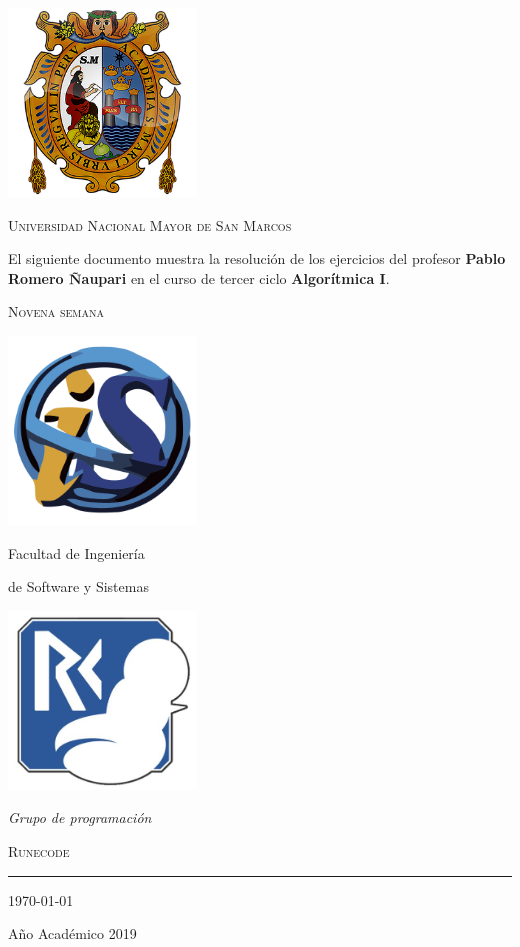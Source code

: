 \documentclass[a4paper,12pt]{book}
\begin{document}
\begin{titlepage}
	\vspace*{-3cm}
	\centering
		\includegraphics[width=5cm]{./escudo_UNMSM.png}
    

	{\scshape\LARGE Universidad Nacional Mayor de San Marcos\par}

	\vspace{1cm}

  {\large El siguiente documento muestra la resolución de los ejercicios del
  profesor \textbf{Pablo Romero Ñaupari} en el curso de tercer ciclo
  \textbf{Algorítmica I}. \par}

	\vspace{.1\textheight}
  { \LARGE \scshape Novena semana}

	\vspace{.07\textheight}

	\parbox{.4\linewidth}{
			\includegraphics[width=5cm]{./escudo_FISI.png}\par
			{Facultad de Ingeniería\par
			de Software y Sistemas}
		}\hfill
	\parbox{.5\linewidth}{
		\raggedleft
			\includegraphics[width=5cm]{./captura.jpg}\par
			\emph{Grupo de programación}\par
			\textsc{Runecode}%
	}

		\vspace{.1\linewidth}

			\vfill

			\rule{.4\textwidth}{.4pt}

	{\large \today\par
	Año Académico 2019\par}

\end{titlepage}
\end{document}

